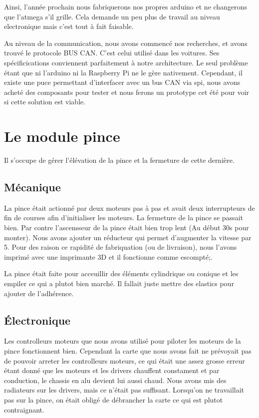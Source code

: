 Ainsi, l'année prochain nous fabriquerons nos propres arduino et ne changerons que l'atmega s'il grille. Cela demande un peu plus de travail au niveau electronique mais c'est tout à fait faisable.

Au niveau de la communication, nous avons commencé nos recherches, et avons trouvé le protocole BUS CAN. C'est celui utilisé dans les voitures. Ses spécificications conviennent parfaitement à notre architecture. Le seul problème étant que ni l'arduino ni la Raspberry Pi ne le gère nativement. Cependant, il existe une puce permettant d'interfacer avec un bus CAN via spi, nous avons acheté des composants pour tester et nous ferons un prototype cet été pour voir si cette solution est viable.

\section{Le module pince}
Il s'occupe de gérer l'élévation de la pince et la fermeture de cette dernière.

\subsection{Mécanique}
La pince était actionné par deux moteurs pas à pas et avait deux interrupteurs de fin de courses afin d'initialiser les moteurs. La fermeture de la pince se passait bien. Par contre l'ascensseur de la pince était bien trop lent (Au début 30s pour monter). Nous avons ajouter un réducteur qui permet d'augmenter la vitesse par 5. Pour des raison ce rapidité de fabriquation (ou de livraison), nous l'avons imprimé avec une imprimante 3D et il fonctionne comme escompté;.

La pince était faite pour acceuillir des éléments cylindrique ou conique et les empiler ce qui a plutot bien marché. Il fallait juste mettre des elastics pour ajouter de l'adhérence.

\subsection{Électronique}
Les controlleurs moteurs que nous avons utilisé pour piloter les moteurs de la pince fonctionnent bien. Cependant la carte que nous avons fait ne prévoyait pas de pouvoir arreter les controlleurs moteurs, ce qui était une assez grosse erreur étant donné que les moteurs et les drivers chauffent constament et par conduction, le chassis en alu devient lui aussi chaud. Nous avons mis des radiateurs sur les drivers, mais ce n'était pas suffisant. Lorsqu'on ne travaillait pas sur la pince, on était obligé de débrancher la carte ce qui est plutot contraignant.

